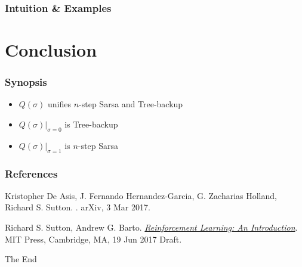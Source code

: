 \documentclass{beamer}
\begin{document}
\begin{frame}
  \frametitle{Intuition & Examples}
\end{frame}

\section{Conclusion}

\begin{frame}
\frametitle{Synopsis}
\begin{itemize}
    \item $Q(\sigma)$ unifies $n$-step Sarsa and Tree-backup
    \item $Q(\sigma)|_{\sigma=0}$ is Tree-backup
    \item $Q(\sigma)|_{\sigma=1}$ is $n$-step Sarsa
\end{itemize}
\end{frame}

\begin{frame}
  \frametitle<presentation>{References}

  \begin{thebibliography}{10}

  \beamertemplatebookbibitems

  \beamertemplatearticlebibitems

    Kristopher De Asis, J. Fernando Hernandez-Garcia, G. Zacharias Holland,
    Richard S. Sutton.
    .
    \newblock arXiv, 3 Mar 2017.

   Richard S. Sutton, Andrew G. Barto.  \newblock
    {\href{http://incompleteideas.net/sutton/book/the-book-2nd.html}{\em
      Reinforcement Learning: An Introduction}}.
    \newblock MIT Press, Cambridge, MA, 19 Jun 2017 Draft.

  \end{thebibliography}
\end{frame}


\begin{frame}
\Huge{\centerline{The End}}
\end{frame}

\end{document}
